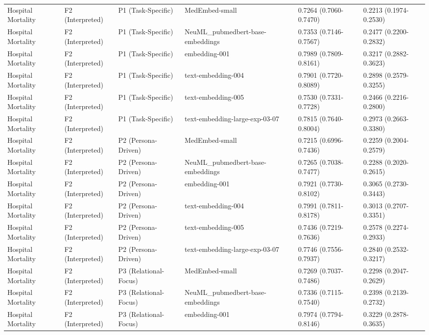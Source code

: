 \documentclass[border=0pt]{standalone}
\begin{document}
\begin{adjustbox}{width=\textwidth}
\begin{tabular}{llllll}
Hospital Mortality & F2 (Interpreted) & P1 (Task-Specific) & MedEmbed-small & 0.7264 (0.7060-0.7470) & 0.2213 (0.1974-0.2530) \\
Hospital Mortality & F2 (Interpreted) & P1 (Task-Specific) & NeuML\_pubmedbert-base-embeddings & 0.7353 (0.7146-0.7567) & 0.2477 (0.2200-0.2832) \\
Hospital Mortality & F2 (Interpreted) & P1 (Task-Specific) & embedding-001 & 0.7989 (0.7809-0.8161) & 0.3217 (0.2882-0.3623) \\
Hospital Mortality & F2 (Interpreted) & P1 (Task-Specific) & text-embedding-004 & 0.7901 (0.7720-0.8089) & 0.2898 (0.2579-0.3255) \\
Hospital Mortality & F2 (Interpreted) & P1 (Task-Specific) & text-embedding-005 & 0.7530 (0.7331-0.7728) & 0.2466 (0.2216-0.2800) \\
Hospital Mortality & F2 (Interpreted) & P1 (Task-Specific) & text-embedding-large-exp-03-07 & 0.7815 (0.7640-0.8004) & 0.2973 (0.2663-0.3380) \\
Hospital Mortality & F2 (Interpreted) & P2 (Persona-Driven) & MedEmbed-small & 0.7215 (0.6996-0.7436) & 0.2259 (0.2004-0.2579) \\
Hospital Mortality & F2 (Interpreted) & P2 (Persona-Driven) & NeuML\_pubmedbert-base-embeddings & 0.7265 (0.7038-0.7477) & 0.2288 (0.2020-0.2615) \\
Hospital Mortality & F2 (Interpreted) & P2 (Persona-Driven) & embedding-001 & 0.7921 (0.7730-0.8102) & 0.3065 (0.2730-0.3443) \\
Hospital Mortality & F2 (Interpreted) & P2 (Persona-Driven) & text-embedding-004 & 0.7991 (0.7811-0.8178) & 0.3013 (0.2707-0.3351) \\
Hospital Mortality & F2 (Interpreted) & P2 (Persona-Driven) & text-embedding-005 & 0.7436 (0.7219-0.7636) & 0.2578 (0.2274-0.2933) \\
Hospital Mortality & F2 (Interpreted) & P2 (Persona-Driven) & text-embedding-large-exp-03-07 & 0.7746 (0.7556-0.7937) & 0.2840 (0.2532-0.3217) \\
Hospital Mortality & F2 (Interpreted) & P3 (Relational-Focus) & MedEmbed-small & 0.7269 (0.7037-0.7486) & 0.2298 (0.2047-0.2629) \\
Hospital Mortality & F2 (Interpreted) & P3 (Relational-Focus) & NeuML\_pubmedbert-base-embeddings & 0.7336 (0.7115-0.7540) & 0.2398 (0.2139-0.2732) \\
Hospital Mortality & F2 (Interpreted) & P3 (Relational-Focus) & embedding-001 & 0.7974 (0.7794-0.8146) & 0.3229 (0.2878-0.3635) \\

\end{tabular}
\end{adjustbox}
\end{document}
